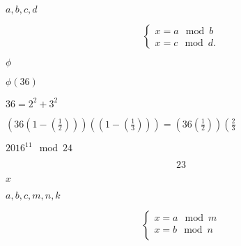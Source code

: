 \documentclass[10pt]{book}
\begin{document}
\begin{mdSnippets}
\begin{mdInlineSnippet}
$a, b, c, d$\end{mdInlineSnippet}%
\begin{mdDisplaySnippet}[9ddaf010c06ad75e29c04815c282e105]%
\[%
\left\{\begin{array}{l}
x = a \mod b\\
x = c \mod d.
\end{array}\right.
\]%
\end{mdDisplaySnippet}%
\begin{mdInlineSnippet}[1ed346930917426bc46d41e22cc525ec]%
$\phi$\end{mdInlineSnippet}%
\begin{mdInlineSnippet}[d80df8daca17b91b658266cd0106e416]%
$\phi(36)$\end{mdInlineSnippet}%
\begin{mdInlineSnippet}[e94162e52281039d65d29c87b51c61d2]%
$36 = 2^2 + 3^2$\end{mdInlineSnippet}%
\begin{mdInlineSnippet}%
$\left(36\left(1 - \left(\frac{1} {2}\right)\right)\right) \left(\left(1 - \left(\frac{1} {3}\right)\right)\right) = \left(36\left(\frac{1} {2} \right)\right) \left(\frac{2} {3}$\end{mdInlineSnippet}%
\begin{mdInlineSnippet}%
$2016^{11} \mod 24$\end{mdInlineSnippet}%
\begin{mdDisplaySnippet}%
\[%
  23
\]%
\end{mdDisplaySnippet}%
\begin{mdInlineSnippet}[9dd4e461268c8034f5c8564e155c67a6]%
$x$\end{mdInlineSnippet}%
\begin{mdInlineSnippet}%
$a,b,c,m,n,k$\end{mdInlineSnippet}%
\begin{mdDisplaySnippet}[5552910c2be0f81d5df1a44fbea473e8]%
\[%
\left\{\begin{array}{l}
x = a \mod m\\
x = b \mod n\\

\end{array}\]
\end{mdDisplaySnippet}
\end{mdSnippets}
\end{document}

